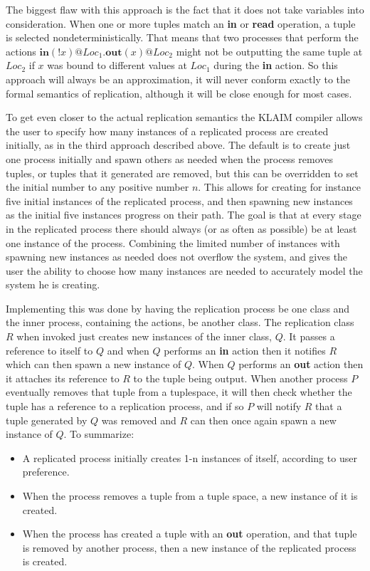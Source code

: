 	The biggest flaw with this approach is the fact that it does not take 
	variables into consideration. When one or more tuples match an \textbf{in} 
	or \textbf{read} operation, a tuple is selected nondeterministically. That
	means that two processes that perform the actions $ \mathbf{in}(!x)@Loc_1 . 
	\mathbf{out}(x)@Loc_2 $ might not be outputting the same tuple at $Loc_2$ if
	$x$ was bound to different values at $Loc_1$ during the \textbf{in} action. 
	So this approach will always be an approximation, it will never conform 
	exactly to the formal semantics of replication, although it will be close
	enough for most cases. 
	
	To get even closer to the actual replication semantics the KLAIM compiler 
	allows the user to specify how many instances of a replicated process are 
	created initially, as in the third approach described above. The default is 
	to create just one process initially and spawn others as needed when the 
	process removes tuples, or tuples that it generated are removed, but this 
	can be overridden to set the initial number to any positive number $n$. This 
	allows for creating for instance five initial instances of the replicated 
	process, and then spawning new instances as the initial five instances 
	progress on their path. The goal is that at every stage in the replicated 
	process there should always (or as often as possible) be at least one 
	instance of the process. Combining the limited number of instances with
	spawning new instances as needed does not overflow the system, and gives
	the user the ability to choose how many instances are needed to accurately
	model the system he is creating.
	
	Implementing this was done by having the replication process be one class 
	and the inner process, containing the actions, be another class. The 
	replication class $R$ when invoked just creates new instances of the inner 
	class, $Q$. It passes a reference to itself to $Q$ and when $Q$ performs an 
	\textbf{in} action then it notifies $R$ which can then spawn a new 
	instance of $Q$. When $Q$ performs an \textbf{out} action then it attaches 
	its reference	to $R$ to the tuple being output. When another process $P$
	eventually removes that tuple from a tuplespace, it will then check whether
	the tuple has a reference to a replication process, and if so $P$ will notify
	$R$ that a tuple generated by $Q$ was removed and $R$ can then once again 
	spawn a new instance of $Q$. To summarize:
	
	\begin{itemize}
		\item A replicated process initially creates 1-n instances of itself, 
		according to user preference.
		
		\item When the process removes a tuple from a tuple space, a new instance
		of it is created.
		
		\item When the process has created a tuple with an \textbf{out} operation, 
		and that tuple is removed by another process, then a new instance of the 
		replicated process is created.
	\end{itemize}

